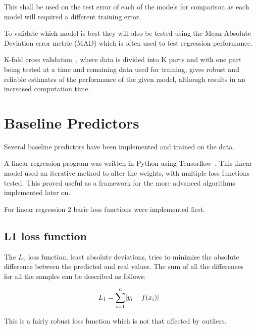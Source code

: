 \documentclass[10pt,twocolumn,letterpaper]{article}
\DeclarePairedDelimiter\abs{\lvert}{\rvert}%
\begin{document}
This shall be used on the test error of each of the models for comparison as each model will required a different training error.

To validate which model is best they will also be tested using the Mean Absolute Deviation error metric (MAD) which is often used to test regression performance.

K-fold cross validation~\cite{CrossValidation}, where data is divided into K parts and with one part being tested at a time and remaining data used for training, gives robust and reliable estimates of the performance of the given model, although results in an increased computation time.

\section{Baseline Predictors}
Several baseline predictors have been implemented and trained on the data. 

A linear regression program was written in Python using Tensorflow~\cite{tensorflow2015-whitepaper}. This linear model used an iterative method to alter the weights, with multiple loss functions tested. This proved useful as a framework for the more advanced algorithms implemented later on.

For linear regression 2 basic loss functions were implemented first.

\subsection{L1 loss function}
The $L_1$ loss function, least absolute deviations, tries to minimise the absolute difference between the predicted and real values. The sum of all the differences for all the samples can be described as follows:

\begin{equation}
L_1 = \sum_{i = 1}^{n} \abs{y_i - f(x_i)}
\end{equation}

This is a fairly robust loss function which is not that affected by outliers.
\end{document}
